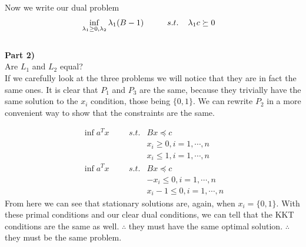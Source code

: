 \documentclass[12pt,letter]{article}
\newcommand{\ppart}[1]{\vspace{2mm}\large\textbf{\\Part {#1})\vspace{2mm}}\normalsize\\}
\begin{document}
Now we write our dual problem
\begin{align*}
    \inf\limits_{\lambda_1\geq0,\lambda_2} \lambda_1(B-1) \hspace{1cm}
    s.t.\hspace{0.4cm} & \lambda_1c \succeq 0 
\end{align*}
\ppart{2}
Are $L_1$ and $L_2$ equal?
\\
If we carefully look at the three problems we will notice that they are in fact the same ones. 
It is clear that $P_1$ and $P_3$ are the same, because they trivially have the 
same solution to the $x_i$ condition, those being $\{0,1\}$. We can rewrite
$P_2$ in a more convenient way to show that the constraints are the same.

\begin{align*}
    \inf a^T x \hspace{1cm}
    s.t. & Bx \preceq c \\
         & x_i \geq 0,i=1,\cdots,n\\
         & x_i \leq 1,i=1,\cdots,n\\
    \inf a^T x \hspace{1cm}
    s.t. & Bx \preceq c \\
         & -x_i \leq 0,i=1,\cdots,n\\
         & x_i -1 \leq 0,i=1,\cdots,n
\end{align*}
From here we can see that stationary solutions are, again, when $x_i=\{0,1\}$.
With these primal conditions and our clear dual conditions, we can tell that 
the KKT conditions are the same as well. $\therefore$ they must have the same 
optimal solution. $\therefore$ they must be the same problem. 
\end{document}

